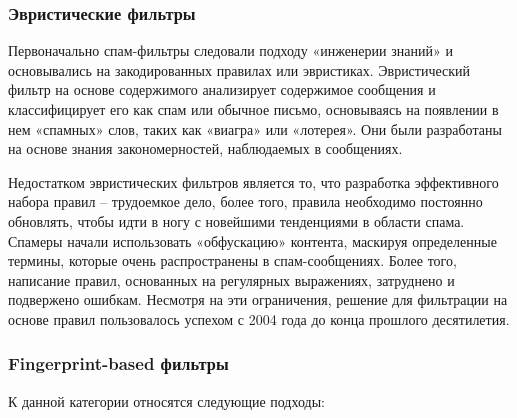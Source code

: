 \subsubsection{Эвристические фильтры}
Первоначально спам-фильтры следовали подходу «инженерии знаний» и основывались
на закодированных правилах или эвристиках. Эвристический фильтр на основе содержимого анализирует содержимое сообщения
и классифицирует его как спам или обычное письмо, основываясь на появлении в нем «спамных» слов, таких
как «виагра» или «лотерея». Они были разработаны на основе знания закономерностей, наблюдаемых в
сообщениях.

Недостатком эвристических фильтров является то, что разработка эффективного набора правил -- трудоемкое
дело, более того, правила необходимо постоянно обновлять, чтобы идти в ногу с новейшими тенденциями в
области спама. Спамеры начали использовать «обфускацию» контента, маскируя определенные термины,
которые очень распространены в спам-сообщениях. Более того, написание правил, основанных на регулярных
выражениях, затруднено и подвержено ошибкам. Несмотря на эти ограничения, решение для фильтрации на
основе правил пользовалось успехом с 2004 года до конца прошлого десятилетия.

\subsubsection{Fingerprint-based фильтры}
К данной категории относятся следующие подходы:

